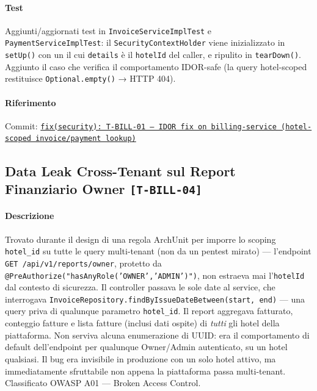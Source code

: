 ﻿\documentclass[a4paper,12pt]{report}
\newcommand{\commitref}[2]{\texttt{\small \href{https://github.com/diegoandruccioli/hotel-pms/commit/#1}{#2}}}
\newcommand{\threat}[1]{\texttt{\small\textcolor{vulnred}{[#1]}}}
\begin{document}
\paragraph{Test}
Aggiunti/aggiornati test in \texttt{InvoiceServiceImplTest} e \texttt{PaymentServiceImplTest}:
il \texttt{SecurityContextHolder} viene inizializzato in \texttt{setUp()} con un
\texttt{} il cui \texttt{details} è il \texttt{hotelId} del
caller, e ripulito in \texttt{tearDown()}. Aggiunto il caso
\texttt{} che verifica il comportamento IDOR-safe
(la query hotel-scoped restituisce \texttt{Optional.empty()} → HTTP 404).

\paragraph{Riferimento} Commit: \commitref{4a44eea}{fix(security): T-BILL-01 --- IDOR fix on billing-service (hotel-scoped invoice/payment lookup)}

\subsection{Data Leak Cross-Tenant sul Report Finanziario Owner \threat{T-BILL-04}}

\paragraph{Descrizione}
Trovato durante il design di una regola ArchUnit per imporre lo scoping \texttt{hotel\_id}
su tutte le query multi-tenant (non da un pentest mirato) --- l'endpoint
\texttt{GET /api/v1/reports/owner}, protetto da \texttt{@PreAuthorize("hasAnyRole('OWNER','ADMIN')")},
non estraeva mai l'\texttt{hotelId} dal contesto di sicurezza. Il controller passava le
sole date al service, che interrogava \texttt{InvoiceRepository.findByIssueDateBetween(start, end)}
--- una query priva di qualunque parametro \texttt{hotel\_id}. Il report aggregava fatturato,
conteggio fatture e lista fatture (inclusi dati ospite) di \emph{tutti} gli hotel della
piattaforma. Non serviva alcuna enumerazione di UUID: era il comportamento di default
dell'endpoint per qualunque Owner/Admin autenticato, su un hotel qualsiasi. Il bug era
invisibile in produzione con un solo hotel attivo, ma immediatamente sfruttabile non
appena la piattaforma passa multi-tenant. Classificato OWASP A01 --- Broken Access Control.
\end{document}
